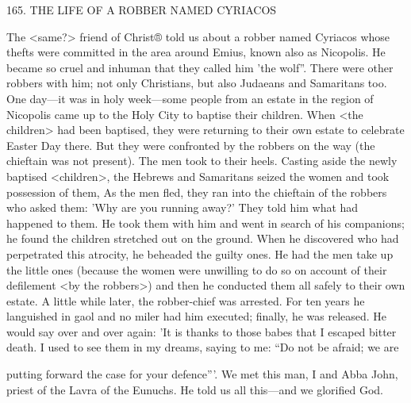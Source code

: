 165. THE LIFE OF A ROBBER NAMED CYRIACOS

The <same?> friend of Christ® told us about a robber named
Cyriacos whose thefts were committed in the area around Emius,
known also as Nicopolis. He became so cruel and inhuman that
they called him 'the wolf”. There were other robbers with him; not
only Christians, but also Judaeans and Samaritans too. One day—it
was in holy week—some people from an estate in the region of
Nicopolis came up to the Holy City to baptise their children. When
<the children> had been baptised, they were returning to their own
estate to celebrate Easter Day there. But they were confronted by
the robbers on the way (the chieftain was not present). The men
took to their heels. Casting aside the newly baptised <children>, the
Hebrews and Samaritans seized the women and took possession of
them, As the men fled, they ran into the chieftain of the robbers
who asked them: 'Why are you running away?' They told him what
had happened to them. He took them with him and went in search
of his companions; he found the children stretched out on the
ground. When he discovered who had perpetrated this atrocity, he
beheaded the guilty ones. He had the men take up the little ones
(because the women were unwilling to do so on account of their
defilement <by the robbers>) and then he conducted them all safely
to their own estate. A little while later, the robber-chief was
arrested. For ten years he languished in gaol and no miler had him
executed; finally, he was released. He would say over and over
again: 'It is thanks to those babes that I escaped bitter death. I used
to see them in my dreams, saying to me: “Do not be afraid; we are

putting forward the case for your defence”'. We met this man, I and
Abba John, priest of the Lavra of the Eunuchs. He told us all
this—and we glorified God.

